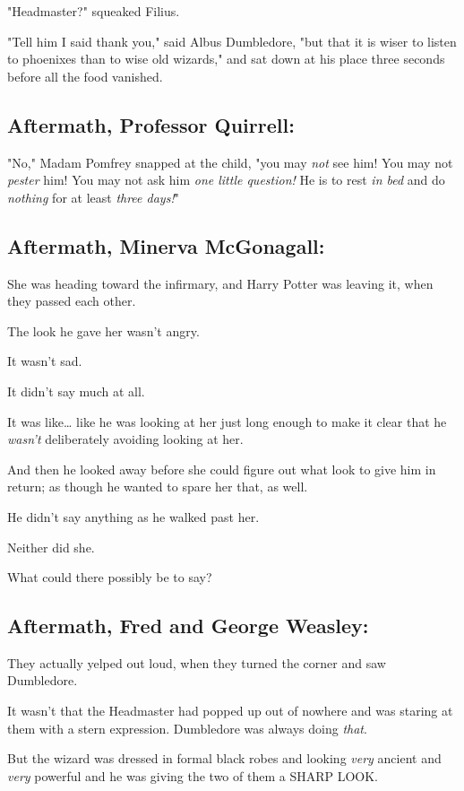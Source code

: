 "Headmaster?" squeaked Filius.

"Tell him I said thank you," said Albus Dumbledore, "but that it is wiser to 
listen to phoenixes than to wise old wizards," and sat down at his place three 
seconds before all the food vanished.
\sbreak
\subsection{Aftermath, Professor Quirrell:}

"No," Madam Pomfrey snapped at the child, "you may \emph{not} see him! You may 
not \emph{pester} him! You may not ask him\emph{ one little question!} He is to 
rest \emph{in bed} and do \emph{nothing} for at least \emph{three days!}"
\sbreak
\subsection{Aftermath, Minerva McGonagall:}

She was heading toward the infirmary, and Harry Potter was leaving it, when 
they passed each other.

The look he gave her wasn't angry.

It wasn't sad.

It didn't say much at all.

It was like{\ldots} like he was looking at her just long enough to make it 
clear that he \emph{wasn't} deliberately avoiding looking at her.

And then he looked away before she could figure out what look to give him in 
return; as though he wanted to spare her that, as well.

He didn't say anything as he walked past her.

Neither did she.

What could there possibly be to say?
\sbreak
\subsection{Aftermath, Fred and George Weasley:}

They actually yelped out loud, when they turned the corner and saw Dumbledore.

It wasn't that the Headmaster had popped up out of nowhere and was staring at 
them with a stern expression. Dumbledore was always doing \emph{that}.

But the wizard was dressed in formal black robes and looking \emph{very} 
ancient and \emph{very} powerful and he was giving the two of them a SHARP LOOK.

